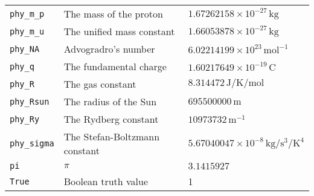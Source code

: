 \begin{landscape}
\begin{center}
\begin{longtable}{|lll|}
{\tt phy\_m\_p} & The mass of the proton & $1.67262158\times10^{-27}\,\mathrm{kg}$ \\
{\tt phy\_m\_u} & The unified mass constant & $1.66053878\times10^{-27}\,\mathrm{kg}$ \\
{\tt phy\_NA} & Advogradro's number & $6.02214199\times10^{23}\,\mathrm{mol}^{-1}$ \\
{\tt phy\_q} & The fundamental charge & $1.60217649\times10^{-19}\,\mathrm{C}$ \\
{\tt phy\_R} & The gas constant & $8.314472\,\mathrm{J}/\mathrm{K}/\mathrm{mol}$ \\
{\tt phy\_Rsun} & The radius of the Sun & $695500000\,\mathrm{m}$ \\
{\tt phy\_Ry} & The Rydberg constant & $10973732\,\mathrm{m}^{-1}$ \\
{\tt phy\_sigma} & The Stefan-Boltzmann constant & $5.67040047\times10^{-8}\,\mathrm{kg}/\mathrm{s}^{3}/\mathrm{K}^{4}$ \\
{\tt pi} & $\pi$ & $3.1415927$ \\
{\tt True} & Boolean truth value & 1 \\
\hline
\end{longtable}
\end{center}
\end{landscape}

